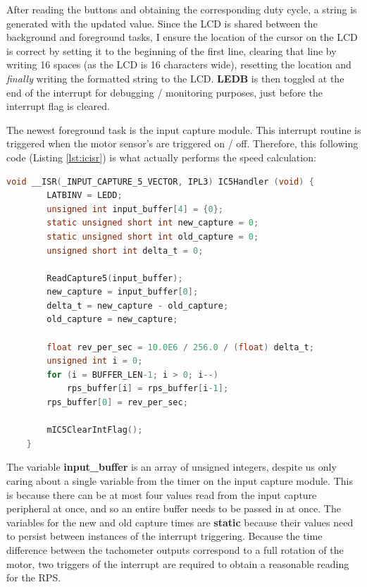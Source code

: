 \documentclass[a4paper, 12pt]{article}
\begin{document}
After reading the buttons and obtaining the corresponding duty cycle, a string is generated with the updated value. Since the LCD is shared between the background and foreground tasks, I ensure the location of the cursor on the LCD is correct by setting it to the beginning of the first line, clearing that line by writing 16 spaces (as the LCD is 16 characters wide), resetting the location and \textit{finally} writing the formatted string to the LCD. \textbf{LEDB} is then toggled at the end of the interrupt for debugging / monitoring purposes, just before the interrupt flag is cleared.

The newest foreground task is the input capture module. This interrupt routine is triggered when the motor sensor's are triggered on / off. Therefore, this following code (Listing \ref{lst:icisr}) is what actually performs the speed calculation:

	\begin{mdframed}[backgroundcolor=code-gray, roundcorner=10pt,
								innerleftmargin=5, innertopmargin=5, innerbottommargin=5]	
	\begin{lstlisting}[language=C, caption=Input Capture ISR, tabsize=2, label={lst:icisr}]
	void __ISR(_INPUT_CAPTURE_5_VECTOR, IPL3) IC5Handler (void) {
		LATBINV = LEDD;
		unsigned int input_buffer[4] = {0};
		static unsigned short int new_capture = 0;
		static unsigned short int old_capture = 0;
		unsigned short int delta_t = 0;

		ReadCapture5(input_buffer);
		new_capture = input_buffer[0];
		delta_t = new_capture - old_capture;
		old_capture = new_capture;

		float rev_per_sec = 10.0E6 / 256.0 / (float) delta_t;
		unsigned int i = 0;
		for (i = BUFFER_LEN-1; i > 0; i--)
			rps_buffer[i] = rps_buffer[i-1];
		rps_buffer[0] = rev_per_sec;

		mIC5ClearIntFlag();
	}
	\end{lstlisting}
	\end{mdframed}
	
The variable \textbf{input\_buffer} is an array of unsigned integers, despite us only caring about a single variable from the timer on the input capture module. This is because there can be at most four values read from the input capture peripheral at once, and so an entire buffer needs to be passed in at once. The variables for the new and old capture times are \textbf{static} because their values need to persist between instances of the interrupt triggering. Because the time difference between the tachometer outputs correspond to a full rotation of the motor, two triggers of the interrupt are required to obtain a reasonable reading for the RPS.
\end{document}
